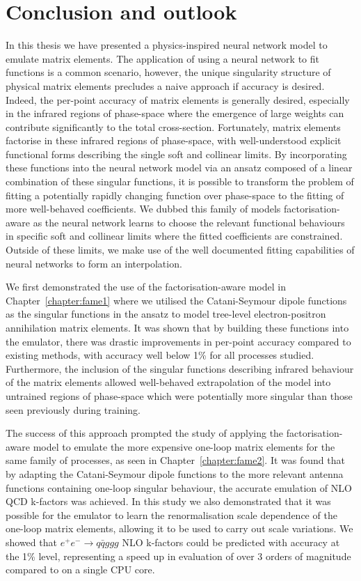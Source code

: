 \documentclass[main.tex]{subfiles}
\begin{document}
\chapter{Conclusion and outlook}
\label{chapter:conclusion}
In this thesis we have presented a physics-inspired
neural network model to emulate matrix elements. The
application of using a neural network to fit functions
is a common scenario, however, the unique singularity
structure of physical matrix elements precludes a naive
approach if accuracy is desired. Indeed, the per-point
accuracy of matrix elements is generally desired, especially
in the infrared regions of phase-space where the emergence of
large weights can contribute significantly to the total cross-section.
Fortunately, matrix elements factorise in these infrared
regions of phase-space, with well-understood explicit functional forms
describing the single soft and collinear limits.
By incorporating these functions into the neural network model via an
ansatz composed of a linear combination of these singular
functions, it is possible to transform the problem of fitting
a potentially rapidly changing function over phase-space
to the fitting of more well-behaved coefficients. We
dubbed this family of models factorisation-aware
as the neural network learns to choose the relevant
functional behaviours in specific soft and collinear limits
where the fitted coefficients are constrained. Outside
of these limits, we make use of the well documented fitting capabilities
of neural networks to form an interpolation.

We first demonstrated the use of the factorisation-aware
model in Chapter~\ref{chapter:fame1}
where we utilised the Catani-Seymour dipole functions as
the singular functions in the ansatz to model tree-level
electron-positron annihilation matrix elements. It was
shown that by building these functions into the emulator,
there was drastic improvements in per-point accuracy compared to
existing methods, with accuracy well below 1\% for all processes studied.
Furthermore, the inclusion of the singular
functions describing infrared behaviour of the matrix
elements allowed well-behaved extrapolation of the model
into untrained regions of phase-space which were potentially
more singular than those seen previously during training.

The success of this approach prompted the study of applying
the factorisation-aware model to emulate the more expensive
one-loop matrix elements for the same family of processes,
as seen in Chapter~\ref{chapter:fame2}.
It was found that by adapting the
Catani-Seymour dipole functions to the more relevant antenna functions
containing one-loop singular behaviour, the
accurate emulation of NLO QCD k-factors was achieved.
In this study we also demonstrated that it was possible
for the emulator to learn the renormalisation scale dependence
of the one-loop matrix elements, allowing it to be used to
carry out scale variations.
We showed that $e^{+}e^{-} \rightarrow q \bar{q} ggg$ NLO k-factors
could be predicted with accuracy at the 1\% level, representing a speed up in
evaluation of over 3 orders of magnitude compared to {\MadLoop} on
a single CPU core.
\end{document}
